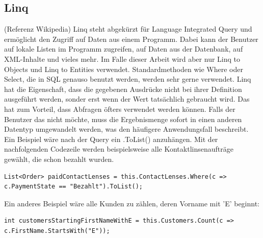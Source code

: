 \subsection{Linq}
(Referenz Wikipedia)
Linq steht abgekürzt für Language Integrated Query und ermöglicht den Zugriff auf Daten aus einem Programm. Dabei kann der Benutzer auf lokale Listen im Programm zugreifen, auf Daten aus der Datenbank, auf XML-Inhalte und vieles mehr. Im Falle dieser Arbeit wird aber nur Linq to Objects und Linq to Entities verwendet. Standardmethoden wie Where oder Select, die in SQL genauso benutzt werden, werden sehr gerne verwendet. 
\newline Linq hat die Eigenschaft, dass die gegebenen Ausdrücke nicht bei ihrer Definition ausgeführt werden, sonder erst wenn der Wert tatsächlich gebraucht wird. Das hat zum Vorteil, dass Abfragen öfters verwendet werden können. Falls der Benutzer das nicht möchte, muss die Ergebnismenge sofort in einen anderen Datentyp  umgewandelt werden, was den häufigere Anwendungsfall beschreibt. Ein Beispiel wäre nach der Query ein .ToList() anzuhängen. 
\newline Mit der nachfolgenden Codezeile werden beispielsweise alle Kontaktlinsenaufträge gewählt, die schon bezahlt wurden.
\begin{lstlisting}
List<Order> paidContactLenses = this.ContactLenses.Where(c => c.PaymentState == "Bezahlt").ToList();
\end{lstlisting}
Ein anderes Beispiel wäre alle Kunden zu zählen, deren Vorname mit 'E' beginnt:
\begin{lstlisting}
int customersStartingFirstNameWithE = this.Customers.Count(c => c.FirstName.StartsWith("E"));
\end{lstlisting}
